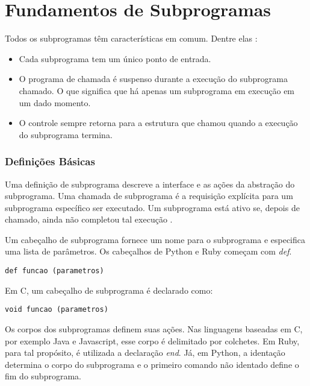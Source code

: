\section{Fundamentos de Subprogramas} %
\label{sec:fundamentos_de_subprogramas}
Todos os subprogramas têm características em comum.
Dentre elas \cite{sebesta}:

\begin{itemize}
	\item Cada subprograma tem um único ponto de entrada.
	\item O programa de chamada é suspenso durante a execução do
	 subprograma chamado. O que significa que há apenas um subprograma em execução
	 em um dado momento.
	\item O controle sempre retorna para a estrutura que chamou quando a execução do subprograma termina.
\end{itemize}

\subsubsection{Definições Básicas} %
\label{ssub:definicoes_basicas}

Uma definição de subprograma descreve a interface e as ações da abstração do subprograma.
Uma chamada de subprograma é a requisição explícita para um subprograma específico 
ser executado. Um subprograma está ativo se, depois de chamado, ainda não completou tal execução \cite{sebesta}.

Um cabeçalho de subprograma fornece um nome para o subprograma e especifica uma lista de parâmetros.
Os cabeçalhos de Python e Ruby começam com \emph{def}.

\begin{verbatim}
def funcao (parametros)
\end{verbatim}

Em C, um cabeçalho de subprograma é declarado como:

\begin{verbatim}
void funcao (parametros)
\end{verbatim}

Os corpos dos subprogramas definem suas ações. Nas linguagens baseadas em C, por exemplo Java e Javascript,
esse corpo é delimitado por colchetes. Em Ruby, para tal propósito, é utilizada a declaração \emph{end}.
Já, em Python, a identação determina o corpo do subprograma e o primeiro comando
não identado define o fim do subprograma.

